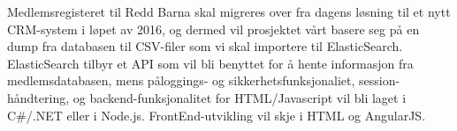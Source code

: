 Medlemsregisteret til Redd Barna skal migreres over fra dagens løsning til et nytt CRM-system i løpet av 2016, og dermed vil prosjektet vårt basere seg på en dump fra databasen til CSV-filer som vi skal importere til ElasticSearch. ElasticSearch tilbyr et API som vil bli benyttet for å hente informasjon fra medlemsdatabasen, mens påloggings- og sikkerhetsfunksjonaliet, session-håndtering, og backend-funksjonalitet for HTML/Javascript vil bli laget i C\#/.NET eller i Node.js. FrontEnd-utvikling vil skje i HTML og AngularJS.